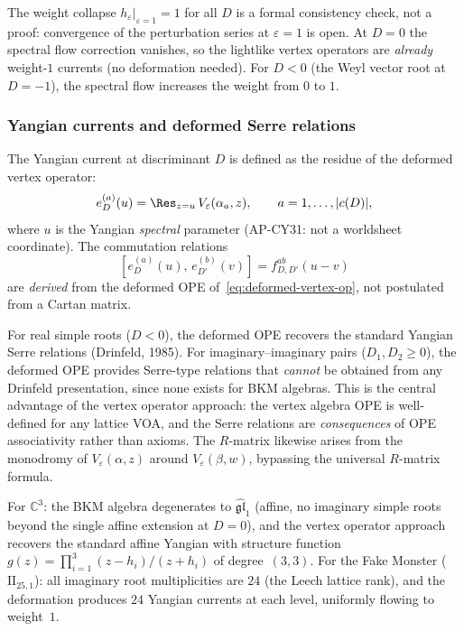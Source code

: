 The weight collapse $h_\varepsilon|_{\varepsilon=1} = 1$ for all $D$ is a formal consistency check, not a proof: convergence of the perturbation series at $\varepsilon = 1$ is open. At $D = 0$ the spectral flow correction vanishes, so the lightlike vertex operators are \emph{already} weight-$1$ currents (no deformation needed). For $D < 0$ (the Weyl vector root at $D = -1$), the spectral flow increases the weight from $0$ to $1$.

\subsubsection{Yangian currents and deformed Serre relations}
\label{subsubsec:k3e-yangian-currents-serre}

The Yangian current at discriminant $D$ is defined as the residue of the deformed vertex operator:
\begin{equation}
\label{eq:yangian-current-def}
e_D^{(a)}(u) = \Res_{z = u}\, V_\varepsilon(\alpha_a, z), \qquad a = 1, \ldots, |c(D)|,
\end{equation}
where $u$ is the Yangian \emph{spectral} parameter (AP-CY31: not a worldsheet coordinate). The commutation relations
\[
[e_D^{(a)}(u),\, e_{D'}^{(b)}(v)] = f_{D,D'}^{ab}(u - v)
\]
are \emph{derived} from the deformed OPE of~\eqref{eq:deformed-vertex-op}, not postulated from a Cartan matrix.

\begin{remark}
\label{rem:bypass-drinfeld}
For real simple roots ($D < 0$), the deformed OPE recovers the standard Yangian Serre relations (Drinfeld, 1985). For imaginary--imaginary pairs ($D_1, D_2 \geq 0$), the deformed OPE provides Serre-type relations that \emph{cannot} be obtained from any Drinfeld presentation, since none exists for BKM algebras. This is the central advantage of the vertex operator approach: the vertex algebra OPE is well-defined for any lattice VOA, and the Serre relations are \emph{consequences} of OPE associativity rather than axioms. The $R$-matrix likewise arises from the monodromy of $V_\varepsilon(\alpha, z)$ around $V_\varepsilon(\beta, w)$, bypassing the universal $R$-matrix formula.
\end{remark}

\begin{remark}
\label{rem:borcherds-vertex-consistency}
For $\mathbb{C}^3$: the BKM algebra degenerates to $\widehat{\mathfrak{gl}}_1$ (affine, no imaginary simple roots beyond the single affine extension at $D = 0$), and the vertex operator approach recovers the standard affine Yangian with structure function $g(z) = \prod_{i=1}^3 (z - h_i)/(z + h_i)$ of degree~$(3,3)$. For the Fake Monster ($\mathrm{II}_{25,1}$): all imaginary root multiplicities are $24$ (the Leech lattice rank), and the deformation produces $24$ Yangian currents at each level, uniformly flowing to weight~$1$.
\end{remark}

